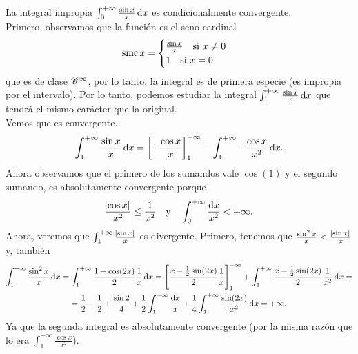 \begin{example}
    La integral impropia $\int^{+\infty}_0 \frac{\sin x}{x} \dif x$ es
    condicionalmente convergente. \\
    Primero, observamos que la función es el seno cardinal
    \[
        \operatorname{sinc} x = \begin{cases} \frac{\sin x}{x} \quad \text{si } x \neq 0 \\
            1 \quad \text{si } x = 0 \end{cases}
    \]
    que es de clase $\mathscr{C}^{\infty}$, por lo tanto, la integral es de primera especie
    (es impropia por el intervalo). Por lo tanto, podemos estudiar la integral
    $\int^{+\infty}_1 \frac{\sin x}{x} \dif x$ que tendrá el mismo carácter que
    la original. \\
    Vemos que es convergente.
    \[
        \int^{+\infty}_1 \frac{\sin x}{x}\dif x =
        \left[-\frac{\cos x}{x}\right]^{+\infty}_1 - \int^{+\infty}_1 
        -\frac{\cos x}{x^2} \dif x.
    \]
    Ahora observamos que el primero de los sumandos vale $\cos(1)$ y el segundo
    sumando, es absolutamente convergente porque
    \[
        \frac{\abs{\cos x}}{x^2} \leq \frac{1}{x^2} \quad \text{y} \quad
        \int^{+\infty}_0 \frac{\dif x}{x^2} < +\infty.
    \]
    Ahora, veremos que $\int^{+\infty}_1 \frac{\abs{\sin x}}{x}$ es divergente.
    Primero, tenemos que $\frac{\sin^2 x}{x} < \frac{\abs{\sin x}}{x}$ y, tambi\'en
    \begin{gather*}
        \int^{+\infty}_1 \frac{\sin^2 x}{x} \dif x = \int^{+\infty}_1
        \frac{1 - \cos(2x)}{2} \frac{1}{x} \dif x = 
        \left[ \frac{x - \frac{1}{2}\sin(2x)}{2}\frac{1}{x} \right]^{+\infty}_1
        + \int^{+\infty}_1 \frac{x -\frac{1}{2}\sin(2x)}{2}\frac{1}{x^2}\dif x=
        \\ = \frac{1}{2} - \frac{1}{2} + \frac{\sin 2}{4} +
        \frac{1}{2}\int^{+\infty}_{1} \frac{\dif x}{x} + \frac{1}{4}
        \int^{+\infty}_1 \frac{\sin(2x)}{x^2} \dif x = +\infty.
    \end{gather*}
    Ya que la segunda integral es absolutamente convergente (por la misma razón que
    lo era $\int^{+\infty}_1 \frac{\cos x}{x^2}$).
\end{example}
